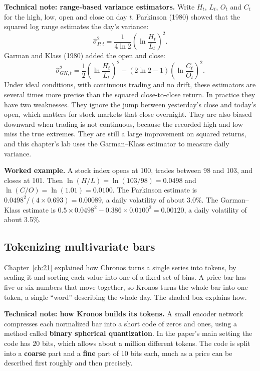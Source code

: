 \begin{technote}
\textbf{Technical note: range-based variance estimators.} Write $H_t$, $L_t$, $O_t$ and $C_t$ for the high, low, open and close on day $t$. Parkinson (1980) showed that the squared log range estimates the day's variance:
\begin{equation}
  \hat\sigma^2_{P,t} = \frac{1}{4 \ln 2} \left(\ln \frac{H_t}{L_t}\right)^2.
  \label{eq:23-parkinson}
\end{equation}
Garman and Klass (1980) added the open and close:
\begin{equation}
  \hat\sigma^2_{GK,t} = \frac{1}{2} \left(\ln \frac{H_t}{L_t}\right)^2 - \left(2\ln 2 - 1\right) \left(\ln \frac{C_t}{O_t}\right)^2.
  \label{eq:23-gk}
\end{equation}
Under ideal conditions, with continuous trading and no drift, these estimators are several times more precise than the squared close-to-close return. In practice they have two weaknesses. They ignore the jump between yesterday's close and today's open, which matters for stock markets that close overnight. They are also biased downward when trading is not continuous, because the recorded high and low miss the true extremes. They are still a large improvement on squared returns, and this chapter's lab uses the Garman--Klass estimator to measure daily variance.
\end{technote}

\textbf{Worked example.} A stock index opens at 100, trades between 98 and 103, and closes at 101. Then $\ln(H/L) = \ln(103/98) = 0.0498$ and $\ln(C/O) = \ln(1.01) = 0.0100$. The Parkinson estimate is $0.0498^2/(4 \times 0.693) = 0.00089$, a daily volatility of about 3.0\%. The Garman--Klass estimate is $0.5 \times 0.0498^2 - 0.386 \times 0.0100^2 = 0.00120$, a daily volatility of about 3.5\%.

\subsection{Tokenizing multivariate bars}

Chapter~\ref{ch:21} explained how Chronos turns a single series into tokens, by scaling it and sorting each value into one of a fixed set of bins. A price bar has five or six numbers that move together, so Kronos turns the whole bar into one token, a single ``word'' describing the whole day. The shaded box explains how.

\begin{technote}
\textbf{Technical note: how Kronos builds its tokens.} A small encoder network compresses each normalized bar into a short code of zeros and ones, using a method called \textbf{binary spherical quantization}. In the paper's main setting the code has 20 bits, which allows about a million different tokens. The code is split into a \textbf{coarse} part and a \textbf{fine} part of 10 bits each, much as a price can be described first roughly and then precisely.
\end{technote}

